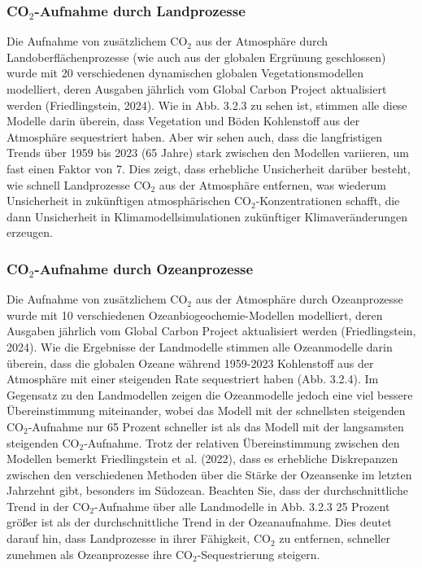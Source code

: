 \documentclass[12pt,paper=a4,DIV=12,parskip=never,chapterprefix=false,headings=standardclasses]{scrreprt}
\begin{document}
\subsubsection*{CO$_2$-Aufnahme durch Landprozesse}
Die Aufnahme von zusätzlichem CO$_2$ aus der Atmosphäre durch Landoberflächenprozesse (wie auch aus der globalen Ergrünung geschlossen) wurde mit 20 verschiedenen dynamischen globalen Vegetationsmodellen modelliert, deren Ausgaben jährlich vom Global Carbon Project aktualisiert werden (Friedlingstein, 2024). Wie in Abb. 3.2.3 zu sehen ist, stimmen alle diese Modelle darin überein, dass Vegetation und Böden Kohlenstoff aus der Atmosphäre sequestriert haben. Aber wir sehen auch, dass die langfristigen Trends über 1959 bis 2023 (65 Jahre) stark zwischen den Modellen variieren, um fast einen Faktor von 7. Dies zeigt, dass erhebliche Unsicherheit darüber besteht, wie schnell Landprozesse CO$_2$ aus der Atmosphäre entfernen, was wiederum Unsicherheit in zukünftigen atmosphärischen CO$_2$-Konzentrationen schafft, die dann Unsicherheit in Klimamodellsimulationen zukünftiger Klimaveränderungen erzeugen.

\subsubsection*{CO$_2$-Aufnahme durch Ozeanprozesse}
Die Aufnahme von zusätzlichem CO$_2$ aus der Atmosphäre durch Ozeanprozesse wurde mit 10 verschiedenen Ozeanbiogeochemie-Modellen modelliert, deren Ausgaben jährlich vom Global Carbon Project aktualisiert werden (Friedlingstein, 2024). Wie die Ergebnisse der Landmodelle stimmen alle Ozeanmodelle darin überein, dass die globalen Ozeane während 1959-2023 Kohlenstoff aus der Atmosphäre mit einer steigenden Rate sequestriert haben (Abb. 3.2.4). Im Gegensatz zu den Landmodellen zeigen die Ozeanmodelle jedoch eine viel bessere Übereinstimmung miteinander, wobei das Modell mit der schnellsten steigenden CO$_2$-Aufnahme nur 65 Prozent schneller ist als das Modell mit der langsamsten steigenden CO$_2$-Aufnahme. Trotz der relativen Übereinstimmung zwischen den Modellen bemerkt Friedlingstein et al. (2022), dass es erhebliche Diskrepanzen zwischen den verschiedenen Methoden über die Stärke der Ozeansenke im letzten Jahrzehnt gibt, besonders im Südozean.
Beachten Sie, dass der durchschnittliche Trend in der CO$_2$-Aufnahme über alle Landmodelle in Abb. 3.2.3 25 Prozent größer ist als der durchschnittliche Trend in der Ozeanaufnahme. Dies deutet darauf hin, dass Landprozesse in ihrer Fähigkeit, CO$_2$ zu entfernen, schneller zunehmen als Ozeanprozesse ihre CO$_2$-Sequestrierung steigern.
\end{document}
